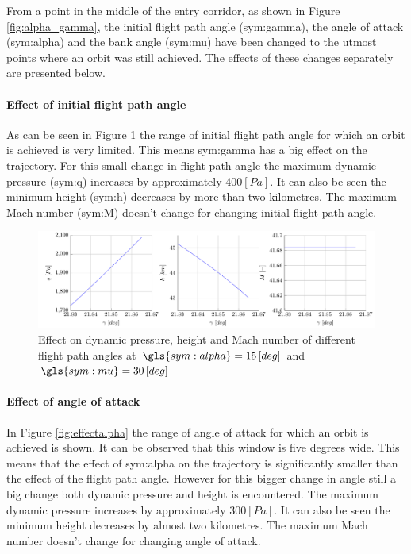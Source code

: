 From a point in the middle of the entry corridor, as shown in Figure \ref{fig:alpha_gamma}, the initial flight path angle (\gls{sym:gamma}), the angle of attack (\gls{sym:alpha}) and the bank angle (\gls{sym:mu}) have been changed to the utmost points where an orbit was still achieved. The effects of these changes separately are presented below.

\paragraph{Effect of initial flight path angle}
As can be seen in Figure \ref{fig:effectgamma} the range of initial flight path angle for which an orbit is achieved is very limited. This means \gls{sym:gamma} has a big effect on the trajectory. For this small change in flight path angle the maximum dynamic pressure (\gls{sym:q}) increases by approximately $400 \left[Pa\right]$. It can also be seen the minimum height (\gls{sym:h}) decreases by more than two kilometres. The maximum Mach number (\gls{sym:M}) doesn't change for changing initial flight path angle.

\begin{figure}[h]
	\centering
	\includegraphics[width=\textwidth]{./Figure/orbit/effectgamma.pdf}
	\caption[Effect on dynamic pressure, height and Mach number of different flight path angles]{Effect on dynamic pressure, height and Mach number of different flight path angles at $\gls{sym:alpha}=15 \left[deg\right]$ and $\gls{sym:mu}=30 \left[deg\right]$}
	\label{fig:effectgamma}
\end{figure}

\paragraph{Effect of angle of attack}

In Figure \ref{fig:effectalpha} the range of angle of attack for which an orbit is achieved is shown. It can be observed that this window is five degrees wide. This means that the effect of \gls{sym:alpha} on the trajectory is significantly smaller than the effect of the flight path angle. However for this bigger change in angle still a big change both dynamic pressure and height is encountered. The maximum dynamic pressure increases by approximately $300 \left[Pa\right]$. It can also be seen the minimum height decreases by almost two kilometres. The maximum Mach number doesn't change for changing angle of attack.

